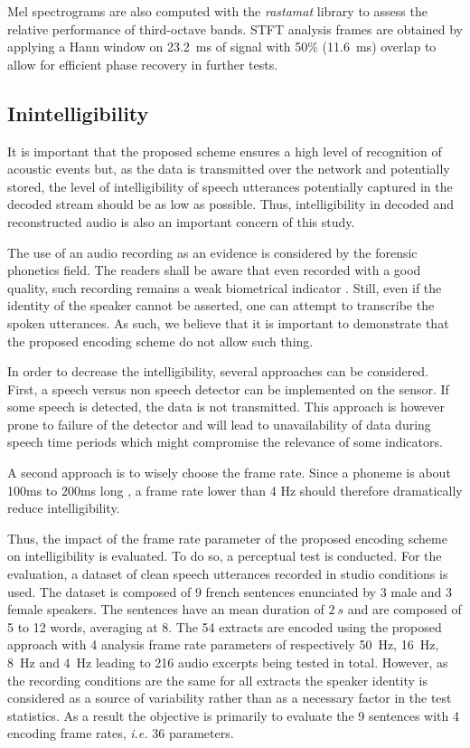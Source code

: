 \documentclass[sensors,article,submit,moreauthors,pdftex,10pt,a4paper]{mdpi}
\begin{document}
Mel spectrograms are also computed with the \textit{rastamat} library \cite{ellis2005} to assess the relative performance of third-octave bands. STFT analysis frames are obtained by applying a Hann window on 23.2~ms of signal with 50\% (11.6~ms) overlap to allow for efficient phase recovery in further tests.

\subsection{Inintelligibility} \label{sec:inintelligibility_p}

It is important that the proposed scheme ensures a high level of recognition of acoustic events but, as the data is transmitted over the network and potentially stored, the level of intelligibility of  speech utterances potentially captured in the decoded stream should be as low as possible. Thus, intelligibility in decoded and reconstructed audio is also an important concern of this study.

The use of an audio recording as an evidence is considered by the forensic phonetics \cite{baldwin1990forensic} field. The readers shall be aware that even recorded with a good quality, such recording remains a weak biometrical indicator \cite{boe2000forensic}. Still, even if the identity of the speaker cannot be asserted, one can attempt to transcribe the spoken utterances. As such, we believe that it is important to demonstrate that the proposed encoding scheme do not allow such thing.

In order to decrease the intelligibility, several approaches can be considered. First, a speech versus non speech detector can be implemented on the sensor. If some speech is detected, the data is not transmitted. This approach is however prone to failure of the detector and will lead to unavailability of data during speech time periods which might compromise the relevance of some indicators.

A second approach is to wisely choose the frame rate. Since a phoneme is about 100ms to 200ms long \cite{kuwabara1996acoustic} \cite{rosen1992temporal}, a frame rate lower than 4 Hz should therefore dramatically reduce intelligibility.

Thus, the impact of the frame rate parameter of the proposed encoding scheme on intelligibility is evaluated. To do so, a perceptual test is conducted. For the evaluation, a dataset of clean speech utterances recorded in studio conditions is used. The dataset is composed of 9 french sentences enunciated by 3 male and 3 female speakers. The sentences have an mean duration of $2~s$ and are composed of 5 to 12 words, averaging at 8. The 54 extracts are encoded using the proposed approach with 4 analysis frame rate parameters of respectively 50~Hz, 16~Hz, 8~Hz and 4~Hz leading to 216 audio excerpts being tested in total. However, as the recording conditions are the same for all extracts the speaker identity is considered as a source of variability rather than as a necessary factor in the test statistics. As a result the objective is primarily to evaluate the 9 sentences with 4 encoding frame rates, \textit{i.e.} 36 parameters.
\end{document}

